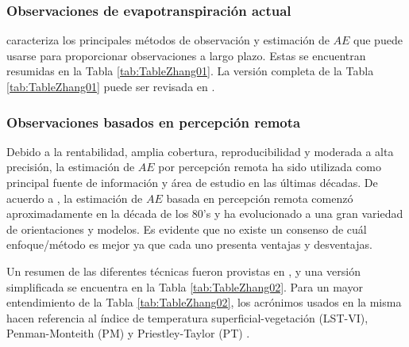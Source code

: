 \documentclass[12pt]{article}
\begin{document}
\clearpage

\clearpage

\subsubsection{Observaciones de evapotranspiración actual}

\citet{wang2012review} caracteriza los principales métodos de observación y estimación de $AE$ que puede usarse para proporcionar observaciones a largo plazo. Estas se encuentran resumidas en la Tabla \ref{tab:TableZhang01}. La versión completa de la Tabla \ref{tab:TableZhang01} puede ser revisada en \citet{wang2012review}.

\vspace{.5cm}

\thispagestyle{empty}

\subsubsection{Observaciones basados en percepción remota}

Debido a la rentabilidad, amplia cobertura, reproducibilidad y moderada a alta precisión, la estimación de $AE$ por percepción remota ha sido utilizada como principal fuente de información y área de estudio en las últimas décadas. De acuerdo a \citet{zhang2016review}, la estimación de $AE$ basada en percepción remota comenzó aproximadamente en la década de los 80's y ha evolucionado a una gran variedad de orientaciones y modelos. Es evidente que no existe un consenso de cuál enfoque/método es mejor ya que cada uno presenta ventajas y desventajas. 

\thispagestyle{empty}

Un resumen de las diferentes técnicas fueron provistas en \citet{zhang2016review}, y una versión simplificada se encuentra en la Tabla \ref{tab:TableZhang02}. Para un mayor entendimiento de la Tabla \ref{tab:TableZhang02}, los acrónimos usados en la misma hacen referencia al índice de temperatura superficial-vegetación (LST-VI), Penman-Monteith (PM) \citep{penman1948natural,monteith1965evaporation} y Priestley-Taylor (PT) \citep{priestley1972assessment}.

\vspace{.5cm}

\thispagestyle{empty}

\end{document}
